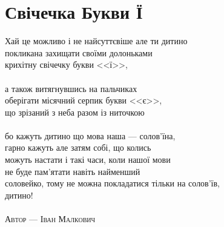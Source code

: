 \section{Свічечка Букви Ї}

Хай це можливо і не найсуттєвіше але ти дитино\\
покликана захищати своїми долоньками\\
крихітну свічечку букви <<ї>>,
\\
\\
а також витягнувшись на пальчиках\\
оберігати місячний серпик букви <<є>>,\\
що зрізаний з неба разом із ниточкою
\\
\\
бо кажуть дитино що мова наша --- солов'їна,\\
гарно кажуть але затям собі, що колись\\
можуть настати і такі часи, коли нашої мови\\
не буде пам'ятати навіть найменший\\
соловейко, тому не можна покладатися тільки на солов'їв, \\
\indent дитино!
\\
\\
\textsc{\footnotesize Автор --- Іван Малкович}

\normalsize
